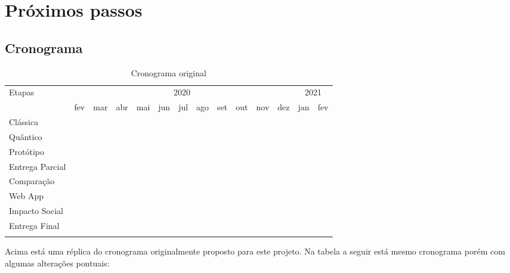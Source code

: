 \section{Próximos passos}
\subsection{Cronograma}
\vspace{1cm}
\begin{longtable}{ |p{2.5cm}||p{0.60cm}|p{0.60cm}|p{0.60cm}|p{0.60cm}|p{0.60cm}|p{0.60cm}|p{0.60cm}|p{0.60cm}|p{0.60cm}|p{0.60cm}|p{0.60cm}|p{0.60cm}|p{0.60cm}|  }
  \hline
  \multirow{2}{*}{Etapas} & 
  \multicolumn{11}{|c|}{2020} & 
  \multicolumn{2}{|c|}{2021} \\
        &
    fev &
    mar &
    abr &
    mai &
    jun &
    jul &
    ago &
    set &
    out &
    nov &
    dez &
    jan &
    fev \\
  \hline
  Clássica & 
  \multicolumn{2}{|c|}{\cellcolor{blue!25}} & 
  & & & & & & & & & & \\
  \hline
  Quântico & 
  \multicolumn{2}{|c|}{\cellcolor{blue!25}} & 
  & & & & & & & & & & \\
  \hline
  Protótipo & &
  \multicolumn{4}{|c|}{\cellcolor{blue!25}} & 
  & & & & & & & \\
  \hline
  Entrega Parcial & & & &
  \multicolumn{5}{|c|}{\cellcolor{blue!25}} & 
  & & & & \\
  \hline
  Comparação & & & & & &
  \multicolumn{2}{|c|}{\cellcolor{blue!25}} & 
  & & & & & \\
  \hline
  Web App & &
  \multicolumn{8}{|c|}{\cellcolor{blue!25}} & 
  & & & \\
  \hline
  Impacto Social & & & & & & & &
  \multicolumn{4}{|c|}{\cellcolor{blue!25}} & 
  & \\
  \hline
  Entrega Final & & & & & & &
  \multicolumn{7}{|c|}{\cellcolor{blue!25}} \\
  \hline
  \caption{Cronograma original}
  \label{original_timeline}
\end{longtable}
\vspace{1cm}

Acima está uma réplica do cronograma originalmente proposto para este projeto. Na tabela a seguir está mesmo cronograma porém com algumas alterações pontuais:

